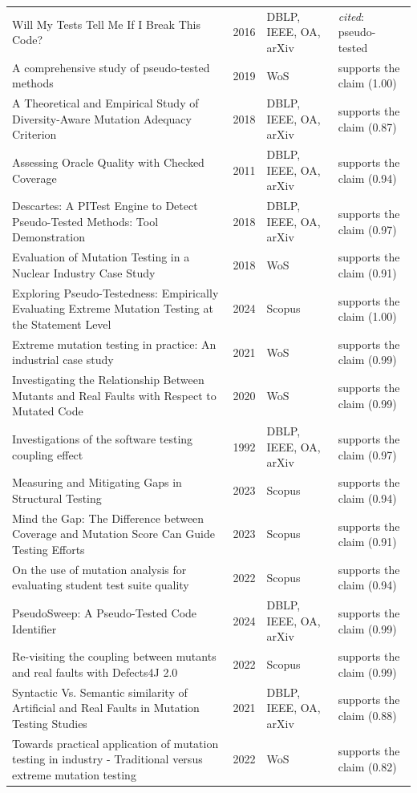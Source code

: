 \begin{longtable}{@{}%
  >{\raggedright\arraybackslash}p{}c%
  >{\raggedright\arraybackslash}p{}%
  >{\raggedright\arraybackslash}p{}@{}}
Will My Tests Tell Me If I Break This Code? & 2016 & DBLP, IEEE, OA, arXiv & \emph{cited}: pseudo-tested \\
A comprehensive study of pseudo-tested methods & 2019 & WoS & supports the claim (1.00) \\
A Theoretical and Empirical Study of Diversity-Aware Mutation Adequacy Criterion & 2018 & DBLP, IEEE, OA, arXiv & supports the claim (0.87) \\
Assessing Oracle Quality with Checked Coverage & 2011 & DBLP, IEEE, OA, arXiv & supports the claim (0.94) \\
Descartes: A PITest Engine to Detect Pseudo-Tested Methods: Tool Demonstration & 2018 & DBLP, IEEE, OA, arXiv & supports the claim (0.97) \\
Evaluation of Mutation Testing in a Nuclear Industry Case Study & 2018 & WoS & supports the claim (0.91) \\
Exploring Pseudo-Testedness: Empirically Evaluating Extreme Mutation Testing at the Statement Level & 2024 & Scopus & supports the claim (1.00) \\
Extreme mutation testing in practice: An industrial case study & 2021 & WoS & supports the claim (0.99) \\
Investigating the Relationship Between Mutants and Real Faults with Respect to Mutated Code & 2020 & WoS & supports the claim (0.99) \\
Investigations of the software testing coupling effect & 1992 & DBLP, IEEE, OA, arXiv & supports the claim (0.97) \\
Measuring and Mitigating Gaps in Structural Testing & 2023 & Scopus & supports the claim (0.94) \\
Mind the Gap: The Difference between Coverage and Mutation Score Can Guide Testing Efforts & 2023 & Scopus & supports the claim (0.91) \\
On the use of mutation analysis for evaluating student test suite quality & 2022 & Scopus & supports the claim (0.94) \\
PseudoSweep: A Pseudo-Tested Code Identifier & 2024 & DBLP, IEEE, OA, arXiv & supports the claim (0.99) \\
Re-visiting the coupling between mutants and real faults with Defects4J 2.0 & 2022 & Scopus & supports the claim (0.99) \\
Syntactic Vs. Semantic similarity of Artificial and Real Faults in Mutation Testing Studies & 2021 & DBLP, IEEE, OA, arXiv & supports the claim (0.88) \\
Towards practical application of mutation testing in industry - Traditional versus extreme mutation testing & 2022 & WoS & supports the claim (0.82) \\

\end{longtable}

